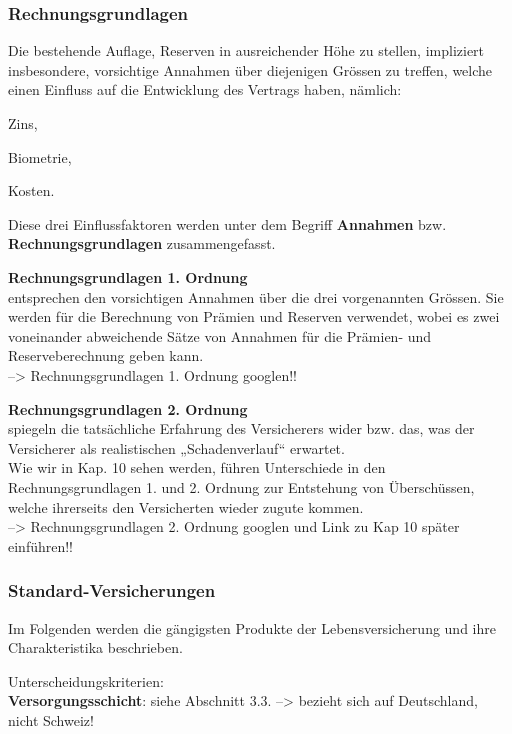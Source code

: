 \documentclass[
]{article}
\begin{document}
\hypertarget{rechnungsgrundlagen}{%
\subsubsection{Rechnungsgrundlagen}\label{rechnungsgrundlagen}}

Die bestehende Auflage, Reserven in ausreichender Höhe zu stellen,
impliziert insbesondere, vorsichtige Annahmen über diejenigen Grössen zu
treffen, welche einen Einfluss auf die Entwicklung des Vertrags haben,
nämlich:

Zins,

Biometrie,

Kosten.

Diese drei Einflussfaktoren werden unter dem Begriff \textbf{Annahmen}
bzw. \textbf{Rechnungsgrundlagen} zusammengefasst.

\textbf{Rechnungsgrundlagen 1. Ordnung}\\
entsprechen den vorsichtigen Annahmen über die drei vorgenannten
Grössen. Sie werden für die Berechnung von Prämien und Reserven
verwendet, wobei es zwei voneinander abweichende Sätze von Annahmen für
die Prämien- und Reserveberechnung geben kann.\\
--\textgreater{} Rechnungsgrundlagen 1. Ordnung googlen!!

\textbf{Rechnungsgrundlagen 2. Ordnung}\\
spiegeln die tatsächliche Erfahrung des Versicherers wider bzw. das, was
der Versicherer als realistischen „Schadenverlauf`` erwartet.\\
Wie wir in Kap. 10 sehen werden, führen Unterschiede in den
Rechnungsgrundlagen 1. und 2. Ordnung zur Entstehung von Überschüssen,
welche ihrerseits den Versicherten wieder zugute kommen.\\
--\textgreater{} Rechnungsgrundlagen 2. Ordnung googlen und Link zu Kap
10 später einführen!!

\hypertarget{standard-versicherungen}{%
\subsubsection{Standard-Versicherungen}\label{standard-versicherungen}}

Im Folgenden werden die gängigsten Produkte der Lebensversicherung und
ihre Charakteristika beschrieben.

Unterscheidungskriterien:\\

\textbf{Versorgungsschicht}: siehe Abschnitt 3.3. --\textgreater{}
bezieht sich auf Deutschland, nicht Schweiz!
\end{document}
